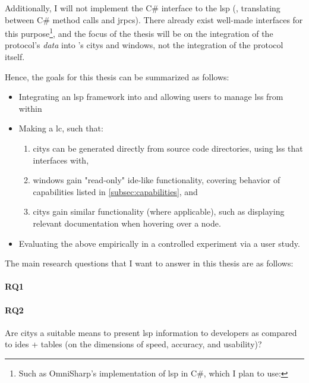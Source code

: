 \documentclass[../thesis]{subfiles}
\begin{document}
Additionally, I will not implement the C\# interface to the \gls{lsp} (\ie, translating between C\# method calls and \glspl{jrpc}).
There already exist well-made interfaces for this purpose\footnote{
	Such as OmniSharp's implementation of \gls{lsp} in C\#, which I plan to use:
}, and the focus of the thesis will be on the integration of the protocol's \emph{data} into \SEE{}'s \glspl{city} and \glspl{window}, not the integration of the protocol itself.

Hence, the goals for this thesis can be summarized as follows:
\begin{itemize}
	\item Integrating an \gls{lsp} framework into \SEE{} and allowing users to manage \glspl{ls} from within \SEE{}
	\item Making \SEE{} a \gls{lc}, such that:
	      \begin{enumerate}
		      \item \Glspl{city} can be generated directly from source code directories, using \glspl{ls} that \SEE{} interfaces with,
		      \item \Glspl{window} gain "read-only" \gls{ide}-like functionality, covering behavior of capabilities listed in \cref{subsec:capabilities}, and
		      \item \Glspl{city} gain similar functionality (where applicable), such as displaying relevant documentation when hovering over a node.
	      \end{enumerate}
	\item Evaluating the above empirically in a controlled experiment via a user study.
\end{itemize}

The main research questions that I want to answer in this thesis are as follows:
\vspace{-1.5em}
\paragraph{RQ1}
\vspace{-1.5em}
\paragraph{RQ2}
Are \glspl{city} a suitable means to present \gls{lsp} information to developers as compared to \glspl{ide} + tables (on the dimensions of speed, accuracy, and usability)?
\end{document}
